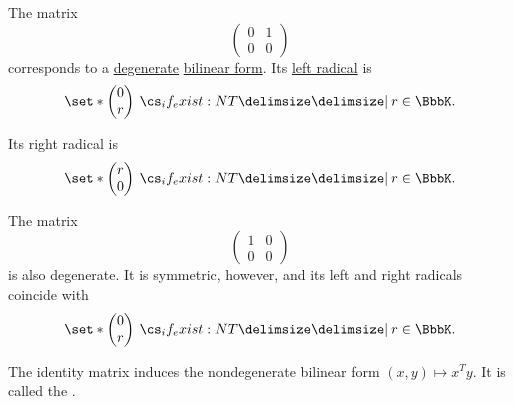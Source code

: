 \begin{example}\label{ex:def:bilinear_form}\hfill
  \begin{thmenum}
     The matrix
    \begin{equation*}
      \begin{pmatrix}
        0 & 1 \\
        0 & 0
      \end{pmatrix}
    \end{equation*}
    corresponds to a \hyperref[def:degenerate_bilinear_form]{degenerate} \hyperref[def:bilinear_form]{bilinear form}. Its \hyperref[def:bilinear_form_radicals]{left radical} is
    \begin{equation*}
      \set*{ \begin{pmatrix} 0 \\ r \end{pmatrix} \given* r \in \BbbK }.
    \end{equation*}

    Its right radical is
    \begin{equation*}
      \set*{ \begin{pmatrix} r \\ 0 \end{pmatrix} \given* r \in \BbbK }.
    \end{equation*}

     The matrix
    \begin{equation*}
      \begin{pmatrix}
        1 & 0 \\
        0 & 0
      \end{pmatrix}
    \end{equation*}
    is also degenerate. It is symmetric, however, and its left and right radicals coincide with
    \begin{equation*}
      \set*{ \begin{pmatrix} 0 \\ r \end{pmatrix} \given* r \in \BbbK }.
    \end{equation*}

     The identity matrix induces the nondegenerate bilinear form \( (x, y) \mapsto x^T y \). It is called the .
  \end{thmenum}
\end{example}

